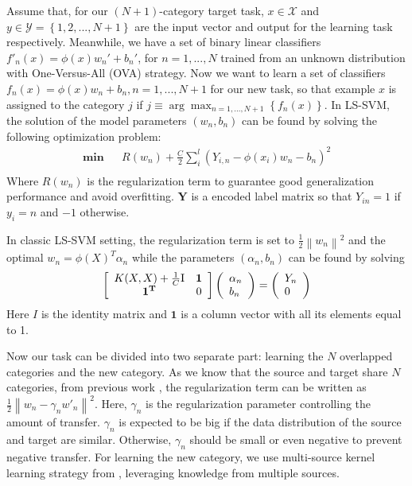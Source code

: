 Assume that, for our $(N+1)$-category target task, ${x} \in \mathcal{X}$ and ${y} \in \mathcal{Y}=\left\{1,2,...,N+1\right\}$ are the input vector and output for the learning task respectively. Meanwhile, we have a set of binary linear classifiers $f'_n(x)=\phi(x)w_n'+b_n'$, for $n=1,...,N$ trained from an unknown distribution with One-Versus-All (OVA) strategy.  Now we want to learn a set of classifiers $f_n(x)=\phi(x)w_n+b_n, n=1,...,N+1$ for our new task, so that example $x$ is assigned to the category $j$ if $j \equiv \arg {\max _{n = 1,...,N+1}}\left\{{f_n}(x)\right\}$. In LS-SVM, the solution of the model parameters $(w_n,b_n)$ can be found by solving the following optimization problem:
\begin{equation*}
\begin{aligned}
\textbf{min} && R({w_n}) + \frac{C}{2}\sum\limits_i^l {({Y_{i,n}} - \phi ({x_i}){w_n} - {b_n})^2} \\
\end{aligned}
\end{equation*}
Where $R({w_n})$ is the regularization term to guarantee good generalization performance and avoid overfitting. $\mathbf{Y}$ is a encoded label matrix so that $Y_{in}=1$ if $y_i=n$ and $-1$ otherwise.  

In classic LS-SVM setting, the regularization term is set to $\frac{1}{2}\left\|w_n\right\|^2$ and the optimal $w_n=\phi(X)^T\alpha_n$ while the parameters $(\alpha_n,b_n)$ can be found by solving
\begin{equation}\label{eq:linear}
\left[ {\begin{array}{*{20}{c}}
{K(X,X) + \frac{1}{C}{\rm{I}}}&\mathbf{1}\\
\mathbf{1^T}&0
\end{array}} \right]\left( \begin{array}{l}
{\alpha _n}\\
{b_n}
\end{array} \right) = \left( \begin{array}{l}
{Y_n}\\
0
\end{array} \right)  
\end{equation}
Here $I$ is the identity matrix and $\mathbf{1}$ is a column vector with all its elements equal to 1.

Now our task can be divided into two separate part: learning the $N$ overlapped categories and the new category. 
As we know that the source and target share $N$ categories, from previous work \cite{yang2007cross}, the regularization term can be written as $\frac{1}{2}{{{\left\| {{w_n} - {\gamma _n}{{w'}_n}} \right\|}^2}}$. Here, $\gamma_n$ is the regularization parameter controlling the amount of transfer. $\gamma_n$ is expected to be big if the data distribution of the source and target are similar. Otherwise, $\gamma_n$ should be small or even negative to prevent negative transfer.  
For learning the new category, we use multi-source kernel learning strategy from \cite{tommasi2014learning}, leveraging knowledge from multiple sources.  

